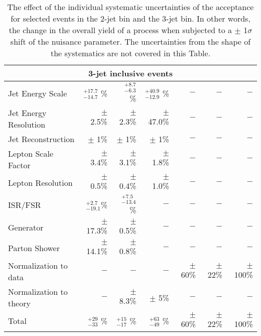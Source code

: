 \begin{table}[!h!tbp]
\begin{center}
\begin{tabular}{lrrrrrr}
 \multicolumn{7}{c}{{\bf 3-jet inclusive events}}\\

\hline
      Jet Energy Scale  &     $^{+17.7}_{-14.7}$ \%  &     $^{+8.7}_{-6.3}$ \%  &     $^{+40.9}_{-12.9}$ \%  &    $-$             &    $-$             &    $-$           \\
 Jet Energy Resolution  &  $\pm$      2.5\%  &  $\pm$      2.3\%  &  $\pm$     47.0\%  &    $-$             &    $-$             &    $-$           \\
    Jet Reconstruction  &  $\pm$       1\%   &  $\pm$       1\%   &  $\pm$        1\%  &    $-$             &    $-$             &    $-$           \\
   Lepton Scale Factor  &  $\pm$      3.4\%  &  $\pm$      3.1\%  &  $\pm$      1.8\%  &    $-$             &    $-$             &    $-$           \\
     Lepton Resolution  &  $\pm$      0.5\%  &  $\pm$      0.4\%  &  $\pm$      1.0\%  &    $-$             &    $-$             &    $-$           \\
               ISR/FSR  &  $^{+2.7}_{-19.1}$\%   &  $^{+7.5}_{-13.4}$\%   &  $-$        &    $-$             &    $-$             &    $-$           \\
             Generator  &  $\pm$     17.3\%  &  $\pm$      0.5\%  &  $-$     &    $-$             &    $-$             &    $-$           \\
         Parton Shower  &  $\pm$     14.1\%  &  $\pm$      0.8\%  &  $-$  &    $-$             &    $-$             &    $-$           \\
 Normalization to data  &    $-$             &    $-$             &    $-$             &  $\pm$       60\%  &  $\pm$       22\%  &  $\pm$       100\%\\
Normalization to theory &    $-$             &  $\pm$      8.3\%  &  $\pm$        5\%  &    $-$             &    $-$             &    $-$           \\ 
\hline
Total & $^{+29}_{-33}$ \% & $^{+15}_{-17}$ \%& $^{+63}_{-49}$ \% &  $\pm$       60\%  &  $\pm$       22\%  &  $\pm$       100\%\\
\hline\hline
\end{tabular} 
\caption{The effect of the individual systematic uncertainties of the acceptance for selected events in the 2-jet bin and the 3-jet bin. In other words, the change in the overall yield of a process when subjected to a $\pm$ 1$\sigma$ shift of the nuisance parameter. The uncertainties from the shape of the systematics are not covered in this Table.}
\label{TAB-SYST2}
\end{center} 
\end{table}


